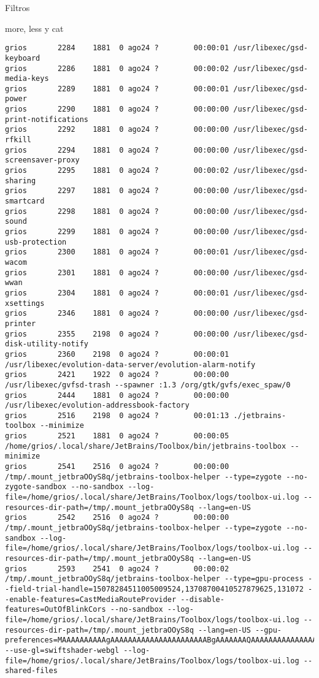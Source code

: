 \begin{section}{Filtros}
\begin{subsection}{more, less y cat}
\begin{lstlisting}[style=Ubuntu]
grios       2284    1881  0 ago24 ?        00:00:01 /usr/libexec/gsd-keyboard
grios       2286    1881  0 ago24 ?        00:00:02 /usr/libexec/gsd-media-keys
grios       2289    1881  0 ago24 ?        00:00:01 /usr/libexec/gsd-power
grios       2290    1881  0 ago24 ?        00:00:00 /usr/libexec/gsd-print-notifications
grios       2292    1881  0 ago24 ?        00:00:00 /usr/libexec/gsd-rfkill
grios       2294    1881  0 ago24 ?        00:00:00 /usr/libexec/gsd-screensaver-proxy
grios       2295    1881  0 ago24 ?        00:00:02 /usr/libexec/gsd-sharing
grios       2297    1881  0 ago24 ?        00:00:00 /usr/libexec/gsd-smartcard
grios       2298    1881  0 ago24 ?        00:00:00 /usr/libexec/gsd-sound
grios       2299    1881  0 ago24 ?        00:00:00 /usr/libexec/gsd-usb-protection
grios       2300    1881  0 ago24 ?        00:00:01 /usr/libexec/gsd-wacom
grios       2301    1881  0 ago24 ?        00:00:00 /usr/libexec/gsd-wwan
grios       2304    1881  0 ago24 ?        00:00:01 /usr/libexec/gsd-xsettings
grios       2346    1881  0 ago24 ?        00:00:00 /usr/libexec/gsd-printer
grios       2355    2198  0 ago24 ?        00:00:00 /usr/libexec/gsd-disk-utility-notify
grios       2360    2198  0 ago24 ?        00:00:01 /usr/libexec/evolution-data-server/evolution-alarm-notify
grios       2421    1922  0 ago24 ?        00:00:00 /usr/libexec/gvfsd-trash --spawner :1.3 /org/gtk/gvfs/exec_spaw/0
grios       2444    1881  0 ago24 ?        00:00:00 /usr/libexec/evolution-addressbook-factory
grios       2516    2198  0 ago24 ?        00:01:13 ./jetbrains-toolbox --minimize
grios       2521    1881  0 ago24 ?        00:00:05 /home/grios/.local/share/JetBrains/Toolbox/bin/jetbrains-toolbox --minimize
grios       2541    2516  0 ago24 ?        00:00:00 /tmp/.mount_jetbraOOyS8q/jetbrains-toolbox-helper --type=zygote --no-zygote-sandbox --no-sandbox --log-file=/home/grios/.local/share/JetBrains/Toolbox/logs/toolbox-ui.log --resources-dir-path=/tmp/.mount_jetbraOOyS8q --lang=en-US
grios       2542    2516  0 ago24 ?        00:00:00 /tmp/.mount_jetbraOOyS8q/jetbrains-toolbox-helper --type=zygote --no-sandbox --log-file=/home/grios/.local/share/JetBrains/Toolbox/logs/toolbox-ui.log --resources-dir-path=/tmp/.mount_jetbraOOyS8q --lang=en-US
grios       2593    2541  0 ago24 ?        00:00:02 /tmp/.mount_jetbraOOyS8q/jetbrains-toolbox-helper --type=gpu-process --field-trial-handle=15078284511005009524,13708700410527879625,131072 --enable-features=CastMediaRouteProvider --disable-features=OutOfBlinkCors --no-sandbox --log-file=/home/grios/.local/share/JetBrains/Toolbox/logs/toolbox-ui.log --resources-dir-path=/tmp/.mount_jetbraOOyS8q --lang=en-US --gpu-preferences=MAAAAAAAAAAgAAAAAAAAAAAAAAAAAAAAAABgAAAAAAAQAAAAAAAAAAAAAAAAAAAACAAAAAAAAAA= --use-gl=swiftshader-webgl --log-file=/home/grios/.local/share/JetBrains/Toolbox/logs/toolbox-ui.log --shared-files

\end{lstlisting}
\end{subsection}
\end{section}
